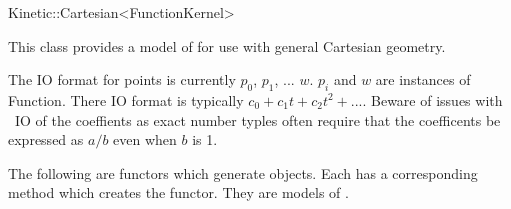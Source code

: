 

\begin{ccRefClass}{Kinetic::Cartesian<FunctionKernel>}  %


\ccDefinition
  
This class provides a model of  for use with general Cartesian geometry.

The IO format for points is currently $p_0$, $p_1$, ... $w$. $p_i$ and $w$ are instances of Function. There IO format is typically $c_0+c_1t+c_2t^2+...$. Beware of issues with \cgal\ IO of the coeffients as exact number typles often require that the coefficents be expressed as $a/b$ even when $b$ is 1.


\ccTypes






The following are functors which generate  objects. Each has a corresponding  method which creates the functor. They are models of .








\end{ccRefClass}
